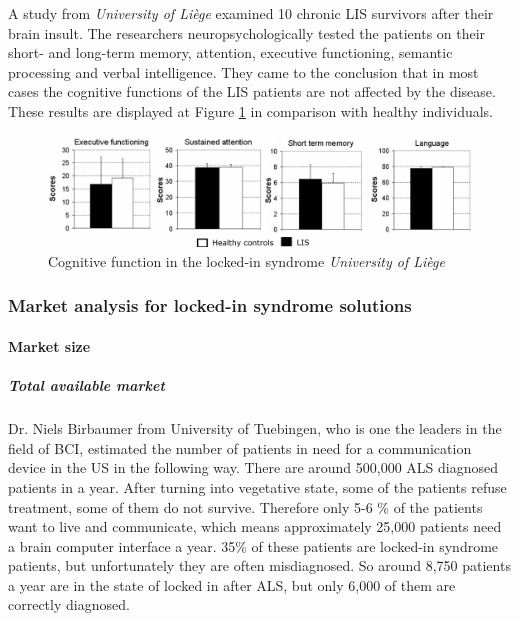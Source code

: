 \documentclass[letterpaper,10pt]{article}
\begin{document}
A study from \textit{University of Liège} examined 10 chronic LIS survivors after their brain insult. The researchers neuropsychologically tested the patients on their short- and long-term memory, attention, executive functioning, semantic processing and verbal intelligence. They came to the conclusion that in most cases the cognitive functions of the LIS patients are not affected by the disease. These results are displayed at Figure  \ref{fig:lis_cogn} in comparison with healthy individuals. \cite{cognitive_lockedin}

\begin{figure}[h]
\centering
\includegraphics[scale=0.3]{lis_cogn.png}
\caption[Cognitive function in the locked-in syndrome]{Cognitive function in the locked-in syndrome \textit{University of Liège} \cite{cognitive_lockedin}}
\label{fig:lis_cogn}
\end{figure}


\subsubsection{Market analysis for locked-in syndrome solutions}
\paragraph{Market size}

\subparagraph{Total available market}
Dr. Niels Birbaumer from University of Tuebingen, who is one the leaders in the field of BCI, estimated the number of patients in need for a communication device in the US in the following way. There are around 500,000 ALS diagnosed patients in a year. After turning into vegetative state, some of the patients refuse treatment, some of them do not survive. Therefore only 5-6 \% of the patients want to live and communicate, which means approximately 25,000 patients need a brain computer interface a year. 35\% of these patients are locked-in syndrome patients, but unfortunately they are often misdiagnosed. So around 8,750 patients a year are in the state of locked in after ALS, but only 6,000 of them are correctly diagnosed.  \cite{niels} 
\end{document}

